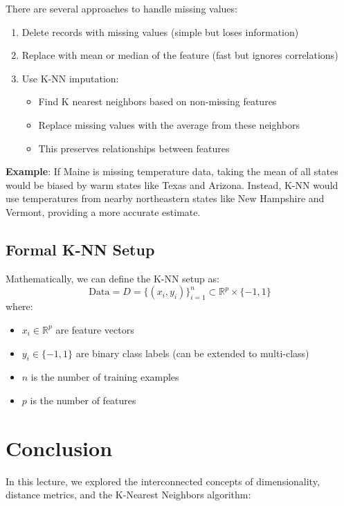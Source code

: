 \documentclass[12pt]{article}
\begin{document}
There are several approaches to handle missing values:
\begin{enumerate}
    \item Delete records with missing values (simple but loses information)
    \item Replace with mean or median of the feature (fast but ignores correlations)
    \item Use K-NN imputation:
        \begin{itemize}
            \item Find K nearest neighbors based on non-missing features
            \item Replace missing values with the average from these neighbors
            \item This preserves relationships between features
        \end{itemize}
\end{enumerate}

\textbf{Example}: If Maine is missing temperature data, taking the mean of all states would be biased by warm states like Texas and Arizona. Instead, K-NN would use temperatures from nearby northeastern states like New Hampshire and Vermont, providing a more accurate estimate.

\subsection{Formal K-NN Setup}
Mathematically, we can define the K-NN setup as:
\[
    \text{Data} = D = \{(x_i,y_i)\}^n_{i=1} \subset \mathbb{R}^p \times \{-1,1\}
\]
where:
\begin{itemize}
    \item $x_i \in \mathbb{R}^p$ are feature vectors
    \item $y_i \in \{-1,1\}$ are binary class labels (can be extended to multi-class)
    \item $n$ is the number of training examples
    \item $p$ is the number of features
\end{itemize}

\section{Conclusion}
In this lecture, we explored the interconnected concepts of dimensionality, distance metrics, and the K-Nearest Neighbors algorithm:
\end{document}
